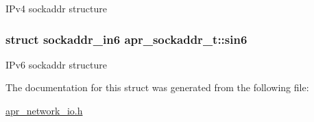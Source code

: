 I\-Pv4 sockaddr structure \hypertarget{structapr__sockaddr__t_ab3a1f900d2a1e58d337a61d99e94d3f9}{
\subsubsection[{sin6}]{\setlength{\rightskip}{0pt plus 5cm}struct sockaddr\-\_\-in6 apr\-\_\-sockaddr\-\_\-t\-::sin6}}\label{structapr__sockaddr__t_ab3a1f900d2a1e58d337a61d99e94d3f9}
I\-Pv6 sockaddr structure 

The documentation for this struct was generated from the following file\-:\begin{DoxyCompactItemize}
\item 
\hyperlink{apr__network__io_8h}{apr\-\_\-network\-\_\-io.\-h}\end{DoxyCompactItemize}
